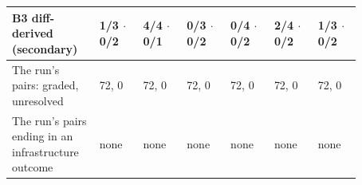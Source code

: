 \begin{table}[t]
\begin{tabular}{p{0.2\linewidth}p{0.112\linewidth}p{0.112\linewidth}p{0.112\linewidth}p{0.112\linewidth}p{0.112\linewidth}p{0.112\linewidth}}
\raggedright\hspace{0pt}B3 diff-derived (secondary) & \raggedright\hspace{0pt}1/3 $\cdot$ 0/2 & \raggedright\hspace{0pt}4/4 $\cdot$ 0/1 & \raggedright\hspace{0pt}0/3 $\cdot$ 0/2 & \raggedright\hspace{0pt}0/4 $\cdot$ 0/2 & \raggedright\hspace{0pt}2/4 $\cdot$ 0/2 & \raggedright\hspace{0pt}1/3 $\cdot$ 0/2 \tabularnewline\midrule
\raggedright\hspace{0pt}The run's pairs: graded, unresolved & \raggedright\hspace{0pt}72, 0 & \raggedright\hspace{0pt}72, 0 & \raggedright\hspace{0pt}72, 0 & \raggedright\hspace{0pt}72, 0 & \raggedright\hspace{0pt}72, 0 & \raggedright\hspace{0pt}72, 0 \tabularnewline
\raggedright\hspace{0pt}The run's pairs ending in an infrastructure outcome & \raggedright\hspace{0pt}none & \raggedright\hspace{0pt}none & \raggedright\hspace{0pt}none & \raggedright\hspace{0pt}none & \raggedright\hspace{0pt}none & \raggedright\hspace{0pt}none \tabularnewline
\bottomrule\end{tabular}\end{table}
